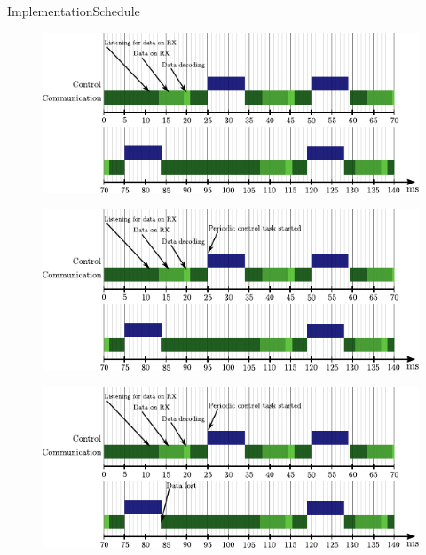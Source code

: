 \begin{frame}{Implementation}{Schedule}
{    }
    {
      \begin{figure}[H]
        \hspace*{-.8cm}
        \includegraphics[width=1.1\linewidth]{figures/newTimingDiagram4}
      \end{figure}
    }
    {
      \begin{figure}[H]
        \hspace*{-.8cm}
        \includegraphics[width=1.1\linewidth]{figures/newTimingDiagram5}
      \end{figure}
    }
    {
      \begin{figure}[H]
        \hspace*{-.8cm}
        \includegraphics[width=1.1\linewidth]{figures/newTimingDiagram6}
      \end{figure}
    }

\end{frame}
